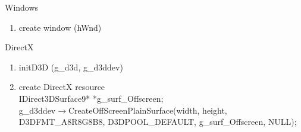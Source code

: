\begin{frame}\logoEvolution
	{\tiny Windows}
	\begin{enumerate}\tiny
		\item create window ({\color{red}hWnd})
	\end{enumerate}

	{\tiny DirectX}
	\begin{enumerate}\tiny
		
		\item initD3D ({\color{red}g\_d3d, g\_d3ddev})
		\item create DirectX resource\\
			IDirect3DSurface9* {\color{red}*g\_surf\_Offscreen};\\
			g\_d3ddev$\rightarrow$CreateOffScreenPlainSurface(width, height, D3DFMT\_A8R8G8B8, D3DPOOL\_DEFAULT, g\_surf\_Offscreen, NULL);
	\end{enumerate}


\end{frame}

